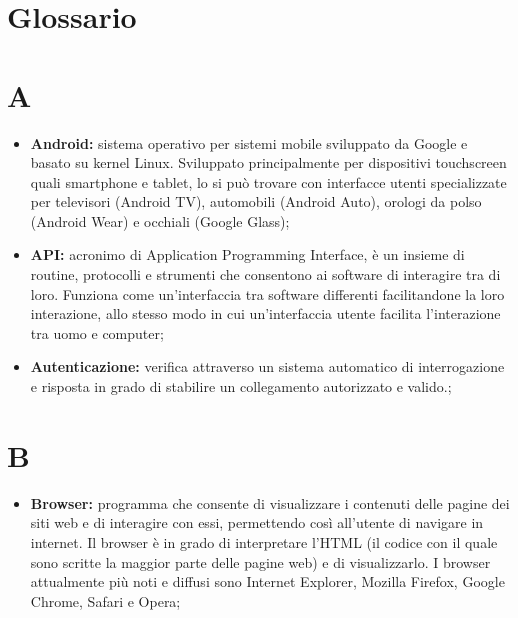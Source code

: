 %

\section{Glossario} %
\label{sec:glossario}


	\section*{\Huge A} %
		\begin{itemize}
			\item \textbf{Android:} sistema operativo per sistemi mobile sviluppato da Google e basato su kernel Linux. Sviluppato principalmente per dispositivi touchscreen quali smartphone e tablet, lo si può trovare con interfacce utenti specializzate per televisori (Android TV), automobili (Android Auto), orologi da polso (Android Wear) e occhiali (Google Glass);
			\item \textbf{API:} acronimo di Application Programming Interface, è un insieme di routine, protocolli e strumenti che consentono ai software di interagire tra di loro. Funziona come un'interfaccia tra software differenti facilitandone la loro interazione, allo stesso modo in cui un'interfaccia utente facilita l'interazione tra uomo e computer;
			\item \textbf{Autenticazione:} verifica attraverso un sistema automatico di interrogazione e risposta in grado di stabilire un collegamento autorizzato e valido.;
		\end{itemize}


	\section*{\Huge B} %
		\begin{itemize}
			\item \textbf{Browser:} programma che consente di visualizzare i contenuti delle pagine dei siti web e di interagire con essi, permettendo così all’utente di navigare in internet. Il browser è in grado di interpretare l’HTML (il codice con il quale sono scritte la maggior parte delle pagine web) e di visualizzarlo. I browser attualmente più noti e diffusi sono Internet Explorer, Mozilla Firefox, Google Chrome, Safari e Opera;
		\end{itemize}


